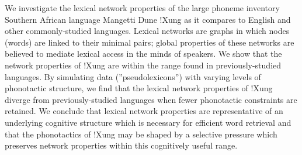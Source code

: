 We investigate the lexical network properties of the large phoneme inventory Southern African language Mangetti Dune !Xung as it compares to English and other commonly-studied languages. Lexical networks are graphs in which nodes (words) are linked to their minimal pairs; global properties of these networks are believed to mediate lexical access in the minds of speakers. We show that the network properties of !Xung are within the range found in previously-studied languages. By simulating data (''pseudolexicons'') with varying levels of phonotactic structure, we find that the lexical network properties of !Xung diverge from previously-studied languages when fewer phonotactic constraints are retained. We conclude that lexical network properties are representative of an underlying cognitive structure which is necessary for efficient word retrieval and that the phonotactics of !Xung may be shaped by a selective pressure which preserves network properties within this cognitively useful range.
